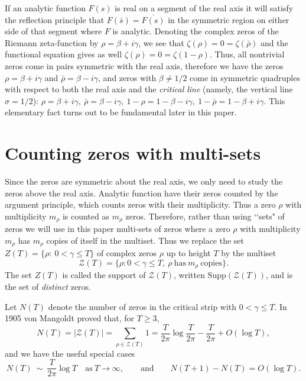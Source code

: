 \documentclass[11pt]{amsart}
\theoremstyle{remark}
\theoremstyle{plain}
\numberwithin{equation}{section}
\begin{document}
If an analytic function $F(s)$ is real on a segment of the real axis it will satisfy the reflection principle that $F(\bar{s})=\overline{F(s)}$ in the symmetric region on either side of that segment where $F$ is analytic. Denoting the complex zeros of the Riemann zeta-function by $\rho=\beta+i\gamma$, we see that
$\zeta(\rho) = 0 = \zeta(\bar{\rho})$ and the functional equation gives as well $\zeta(\rho) = 0 = \zeta(1-\rho)$. Thus,
all nontrivial zeros come in pairs symmetric with the real axis, therefore we have the zeros $\rho=\beta+i\gamma$ and $\bar{\rho}=\beta-i\gamma$, and 
zeros with $\beta\neq 1/2$ come in symmetric quadruples with respect to both the real axis and the {\it critical line} (namely, the vertical line $\sigma=1/2$):
$\rho =\beta + i\gamma ,\ \bar{\rho}=\beta-i\gamma, \ 1-\rho = 1-\beta -i\gamma, \ 1-\bar{\rho}= 1-\beta +i\gamma $. This elementary fact turns out to be fundamental later in this paper.

\section{Counting zeros with multi-sets}
Since the zeros are symmetric about the real axis, we only need to study the zeros above the real axis. Analytic function have their zeros counted by the argument principle, which counts zeros with their multiplicity. Thus a zero $\rho$ with multiplicity $m_\rho $ is counted as $m_\rho$ zeros. Therefore, rather than using \lq\lq sets" of zeros we will use in this paper multi-sets of zeros where a zero $\rho$ with multiplicity $m_\rho$ has $m_\rho$ copies of itself in the multiset. Thus we replace the set $ Z(T) = \{ \rho: \ 0<\gamma \le T \}$ of complex zeros $\rho$ up to height $T$ by the multiset 
\begin{equation} \label{calZ(T)} \mathcal{Z}(T) = \{ \rho : 0 < \gamma \le T,\ \rho \ \text{has} \ m_\rho\ \text{copies} \}. \end{equation}
The set $Z(T)$ is called the support of $\mathcal{Z}(T)$, written $\text{Supp}(\mathcal{Z}(T))$, and is the set of \emph{distinct} zeros.


 Let $ N(T)$ denote the number of zeros in the critical strip with $0< \gamma \le T$. In 1905 von Mangoldt proved that, for $T\ge3$,
\begin{equation} \label{N(T)sum} N(T)= | \mathcal{Z}(T)| = \sum_{\rho \in \mathcal{Z}(T)}1 = \frac{T}{2\pi}\log \frac{T}{2\pi} - \frac{T}{2\pi} + O(\log{T}) , \end{equation}
and we have the useful special cases
\begin{equation} \label{N(T)easy}N(T)~\sim~ \frac{T}{2\pi}\log{T} \quad \text{as} \ T\to \infty, \qquad \text{and} \qquad N(T+1)-N(T) = O(\log{T}).\end{equation}
\end{document}
